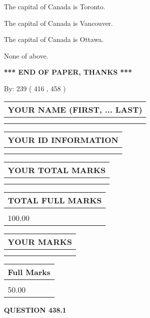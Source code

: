 \documentclass[12pt]{article}
\begin{document}
  
 
 
The capital of Canada is Toronto.
 
 
The capital of Canada is Vancouver.
 
 
The capital of Canada is Ottawa.
 
 
 None of above.
 
 
   
   
\vspace{1.0in} 
{\textbf{\large{ *** END OF PAPER, THANKS *** }}} 
   
   
\hspace{1.0in} By: 
 239 ( 416 ,  458 )
   
   
   
   
\newpage 
\setcounter{page}{ 
   438001 } 
   
   
   
   
\noindent\begin{tabular}{|l|}
\hline
YOUR NAME (FIRST, ... LAST)  \\
\hline
 \\ 
 \\ 
\hline
\end{tabular}
\hspace{0.05in} \begin{tabular}{|l|}
\hline
 YOUR   ID   INFORMATION  \\
\hline
 \\ 
 \\ 
\hline
\end{tabular}
   
   
\vspace{0.2in}\noindent\begin{tabular}{|l|}
\hline
YOUR TOTAL MARKS  \\
\hline
 \\ 
 \\ 
\hline
\end{tabular}
\hspace{0.05in} \begin{tabular}{|l|}
\hline
TOTAL FULL MARKS  \\
\hline
 \\ 
100.00 \\
\hline
\end{tabular}
  
\vspace{0.2in}
  
\noindent\begin{tabular}{|l|}
\hline
 YOUR MARKS  \\
\hline
 \\ 
 \\ 
\hline
\end{tabular}
\hspace{0.05in} \begin{tabular}{|l|}
\hline
 Full Marks  \\
\hline
 \\ 
50.00 \\
\hline
\end{tabular}
{\textbf{\Large{QUESTION
438.1 
}}}
  
\end{document}
